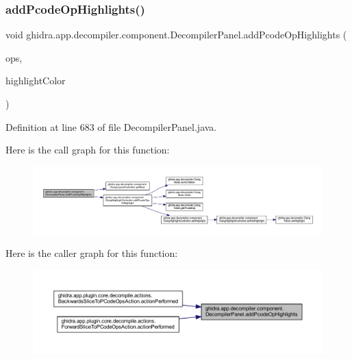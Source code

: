 \subsubsection{\texorpdfstring{addPcodeOpHighlights()}{addPcodeOpHighlights()}}
{\footnotesize\ttfamily void ghidra.\+app.\+decompiler.\+component.\+Decompiler\+Panel.\+add\+Pcode\+Op\+Highlights (\begin{DoxyParamCaption}\item[{Set$<$ \mbox{\hyperlink{class_pcode_op}{Pcode\+Op}} $>$}]{ops,  }\item[{Color}]{highlight\+Color }\end{DoxyParamCaption})\hspace{0.3cm}{\ttfamily [inline]}}



Definition at line 683 of file Decompiler\+Panel.\+java.

Here is the call graph for this function\+:
\nopagebreak
\begin{figure}[H]
\begin{center}
\leavevmode
\includegraphics[width=350pt]{classghidra_1_1app_1_1decompiler_1_1component_1_1_decompiler_panel_a357e374bd4d157ddf0fcc3bd4945a566_cgraph}
\end{center}
\end{figure}
Here is the caller graph for this function\+:
\nopagebreak
\begin{figure}[H]
\begin{center}
\leavevmode
\includegraphics[width=350pt]{classghidra_1_1app_1_1decompiler_1_1component_1_1_decompiler_panel_a357e374bd4d157ddf0fcc3bd4945a566_icgraph}
\end{center}
\end{figure}
\mbox{\label{classghidra_1_1app_1_1decompiler_1_1component_1_1_decompiler_panel_a95b083e3ec26f9c72f78240bfc26f946}} 
